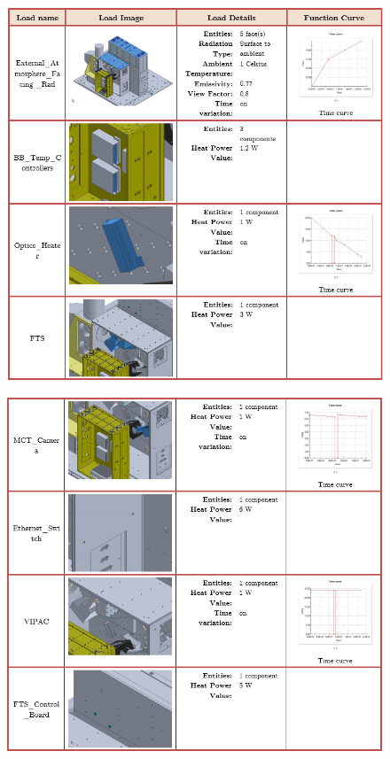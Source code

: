 \begin{figure}[h!]
    \centering
    \includegraphics[width=\textwidth]{thermal_load_images/sunrise_TL_images/sunrise_1.PNG}
\end{figure}

\begin{figure}
    \centering
    \includegraphics[width=\textwidth]{thermal_load_images/sunrise_TL_images/sunrise_2.PNG}
\end{figure}

